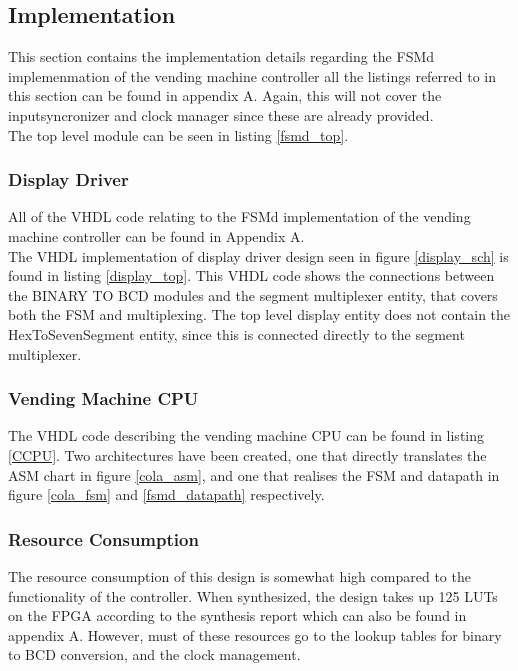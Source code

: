 \subsection{Implementation}
This section contains the implementation details regarding the FSMd implemenmation of the vending machine controller all the listings referred to in this section can be found in appendix A.
Again, this will not cover the inputsyncronizer and clock manager since these are already provided. \\

The top level module can be seen in listing \ref{fsmd_top}.
\subsubsection{Display Driver}
All of the VHDL code relating to the FSMd implementation of the vending machine controller can be found in Appendix A. \\


The VHDL implementation of display driver design seen in figure \ref{display_sch} is found in listing 
\ref{display_top}.
This VHDL code shows the connections between the BINARY TO BCD modules and the segment multiplexer entity, that covers both the FSM and multiplexing.
The top level display entity does not contain the HexToSevenSegment entity, since this is connected directly to the segment multiplexer.

\subsubsection{Vending Machine CPU}
The VHDL code describing the vending machine CPU can be found in listing \ref{CCPU}.
Two architectures have been created, one that directly translates the ASM chart in figure \ref{cola_asm}, and one that realises the FSM and datapath in figure \ref{cola_fsm} and \ref{fsmd_datapath} respectively.


\subsubsection{Resource Consumption}
The resource consumption of this design is somewhat high compared to the functionality of the controller.
When synthesized, the design takes up 125 LUTs on the FPGA according to the synthesis report which can also be found in appendix A.
However, must of these resources go to the lookup tables for binary to BCD conversion, and the clock management.
